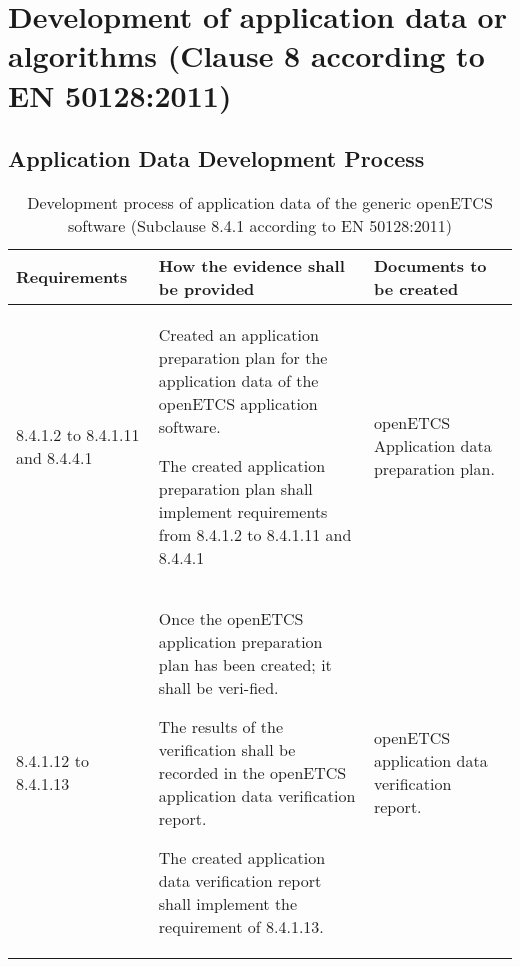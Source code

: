 \documentclass{template/openetcs_report}
\begin{document}
\section{Development of application data or algorithms (Clause 8 according to EN 50128:2011)}
\label{clause82}

\subsection{Application Data Development Process}
{\footnotesize\sffamily\centering
\begin{longtable}{|p{2cm}|p{9cm}|p{3cm}|}
\caption{Development process of application data of the generic openETCS software (Subclause 8.4.1 according to EN 50128:2011)}\\
\hline
\bfseries Requirements & \bfseries How the evidence shall be provided & \bfseries Documents to be created\\
\hline
\hline
\endhead
\hline
\endfoot

8.4.1.2 to 8.4.1.11 and 8.4.4.1 & Created an application preparation plan for the application data of the openETCS application software.

The created application preparation plan shall implement requirements from 8.4.1.2 to 8.4.1.11 and 8.4.4.1
& openETCS Application data preparation plan.\\ 
\hline
8.4.1.12 to 8.4.1.13 & Once the openETCS application preparation plan has been created; it shall be veri-fied.

The results of the verification shall be recorded in the openETCS application data verification report.

The created application data verification report shall implement the requirement of 8.4.1.13.
& openETCS application data verification report.\\ 
\hline
\end{longtable}}
\end{document}

